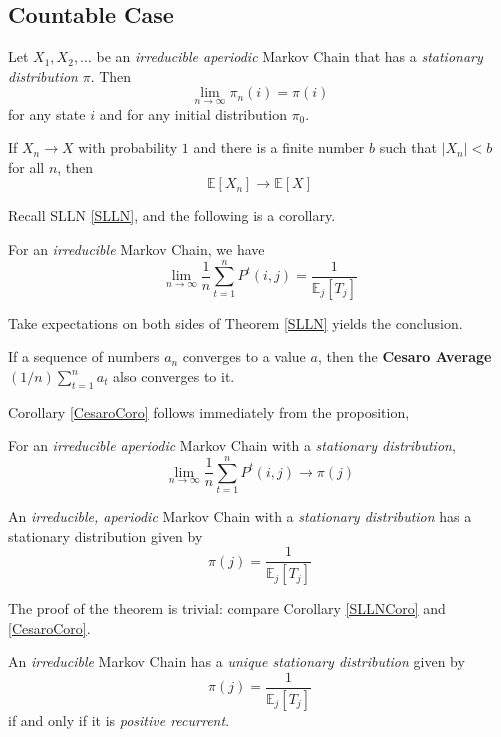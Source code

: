 \subsection{Countable Case}
\begin{theorem}
    Let $X_1, X_2, \dots$ be an \emph{irreducible aperiodic} Markov Chain that has a \emph{stationary distribution} $\pi$. Then
    \[ \lim_{n\to\infty}\pi_n(i) = \pi(i) \]
    for any state $i$ and for any initial distribution $\pi_0$.
\end{theorem}
\begin{lemma}\label{BCT}
    If $X_n \to X$ with probability $1$ and there is a finite number $b$ such that $|X_n| < b$ for all $n$, then
    \[ \mathbb{E}[X_n] \to \mathbb{E}[X] \]
\end{lemma}
Recall SLLN \ref{SLLN}, and the following is a corollary.
\begin{corollary}\label{SLLNCoro}
    For an \emph{irreducible} Markov Chain, we have
    \[ \lim_{n\to\infty} \frac{1}{n}\sum_{t=1}^n P^t(i,j) = \frac{1}{\mathbb{E}_j[T_j]} \]
\end{corollary}
\begin{sketchproof}
    Take expectations on both sides of Theorem \ref{SLLN} yields the conclusion.
\end{sketchproof}
\begin{proposition}
    If a sequence of numbers $a_n$ converges to a value $a$, then the \textbf{Cesaro Average} $(1/n)\sum_{t=1}^na_t$ also converges to it.
\end{proposition}
Corollary \ref{CesaroCoro} follows immediately from the proposition,
\begin{corollary}\label{CesaroCoro}
    For an \emph{irreducible aperiodic} Markov Chain with a \emph{stationary distribution},
    \[ \lim_{n\to\infty}\frac{1}{n}\sum_{t=1}^nP^t(i,j) \to \pi(j) \]
\end{corollary}
\begin{theorem}
    An \emph{irreducible, aperiodic} Markov Chain with a \emph{stationary distribution} has a stationary distribution given by
    \[ \pi(j) = \frac{1}{\mathbb{E}_j[T_j]} \]
\end{theorem}
\begin{sketchproof}
    The proof of the theorem is trivial: compare Corollary \ref{SLLNCoro} and \ref{CesaroCoro}.
\end{sketchproof}
\begin{theorem}
    An \emph{irreducible} Markov Chain has a \emph{unique stationary distribution} given by
    \[ \pi(j) = \frac{1}{\mathbb{E}_j[T_j]} \]
    if and only if it is \emph{positive recurrent}.
\end{theorem}

